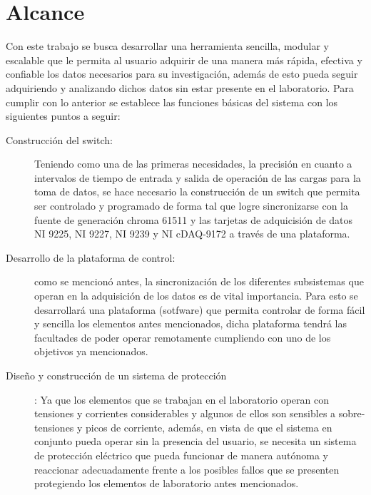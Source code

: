 \chapter{Alcance}
Con este trabajo se busca desarrollar una herramienta sencilla, modular y escalable que le permita al usuario adquirir de una manera más rápida, efectiva y confiable los datos necesarios para su investigación, además de esto pueda seguir adquiriendo y analizando dichos datos sin estar presente en el laboratorio. Para cumplir con lo anterior se establece las funciones básicas del sistema con los siguientes puntos a seguir:   

\begin{description}

\item[Construcción del switch:] Teniendo como una de las primeras necesidades, la precisión en cuanto a intervalos de tiempo de entrada y salida de operación de las cargas para la toma de datos, se hace necesario la construcción de un switch que permita ser controlado y programado de forma tal que logre sincronizarse con la fuente de generación chroma 61511 y las tarjetas de adquicisión de datos NI 9225, NI 9227, NI 9239 y NI cDAQ-9172 a través de una plataforma.

\item[Desarrollo de la plataforma de control:] como se mencionó antes, la sincronización de los diferentes subsistemas que operan en la adquisición de los datos es de vital importancia. Para esto se desarrollará una plataforma (sotfware) que permita controlar de forma fácil y sencilla los elementos antes mencionados, dicha plataforma tendrá las facultades de poder operar remotamente cumpliendo con uno de los objetivos ya mencionados.      

\item[Diseño y construcción de un sistema de protección]: Ya que los elementos que se trabajan en el laboratorio operan con tensiones y corrientes considerables y algunos de ellos son sensibles a sobre-tensiones y picos de corriente, además, en vista de que el sistema en conjunto pueda operar sin la presencia del usuario, se necesita un sistema de protección eléctrico que pueda funcionar de manera autónoma y reaccionar adecuadamente frente a los posibles fallos que se presenten protegiendo los elementos de laboratorio antes mencionados.  

 
 
  
  
\end{description} 